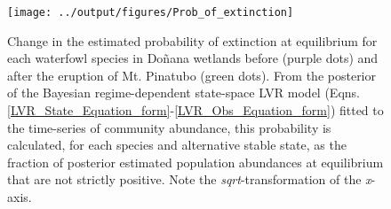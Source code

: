 \documentclass[12pt]{article}
\begin{document}
	\begin{figure}[t]
		\centering
		\texttt{[image: ../output/figures/Prob\_of\_extinction]}
		\caption[Change in probability of species extinction between two periods]{Change in the estimated probability of extinction at equilibrium for each waterfowl species in Doñana wetlands before (purple dots) and after the eruption of Mt. Pinatubo (green dots). From the posterior of the Bayesian regime-dependent state-space LVR model (Eqns. \ref{LVR_State_Equation_form}-\ref{LVR_Obs_Equation_form}) fitted to the time-series of community abundance, this probability is calculated, for each species and alternative stable state, as the fraction of posterior estimated population abundances at equilibrium that are not strictly positive. Note the \textit{sqrt}-transformation of the \textit{x}-axis.}
		\label{fig:Extinction}
	\end{figure}
	
\end{document}
